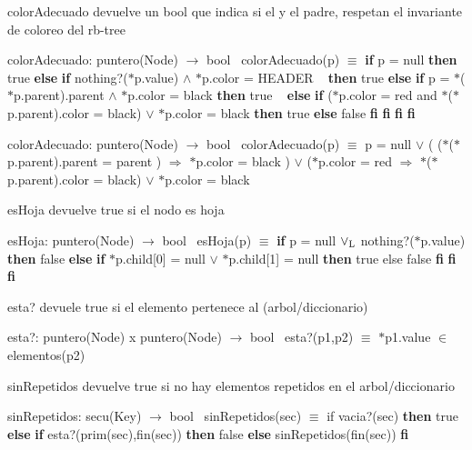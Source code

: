 \begin{DoxyParagraph}{color\+Adecuado}
devuelve un bool que indica si el y el padre, respetan el invariante de coloreo del rb-\/tree

color\+Adecuado\+: puntero(\+Node) $\to$ bool~\newline
 color\+Adecuado(p) $\equiv$ {\bfseries if} p = null {\bfseries then} true {\bfseries else} {\bfseries if} nothing?($\ast$p.value) $\land$ $\ast$p.color = H\+E\+A\+D\+ER ~\newline
 {\bfseries then} true {\bfseries else} {\bfseries if} p = $\ast$($\ast$p.parent).parent $\land$ $\ast$p.color = black {\bfseries then} true ~\newline
 {\bfseries else} {\bfseries if} ($\ast$p.color = red and $\ast$($\ast$p.parent).color = black) $\lor$ $\ast$p.color = black {\bfseries then} true {\bfseries else} false {\bfseries fi} {\bfseries fi} {\bfseries fi} {\bfseries fi} 

color\+Adecuado\+: puntero(\+Node) $\to$ bool~\newline
 color\+Adecuado(p) $\equiv$ p = null $\lor$ ( ($\ast$($\ast$p.parent).parent = parent ) $\Rightarrow$ $\ast$p.color = black ) $\lor$ ($\ast$p.color = red $\Rightarrow$ $\ast$($\ast$p.parent).color = black) $\lor$ $\ast$p.color = black 
\end{DoxyParagraph}


\begin{DoxyParagraph}{es\+Hoja}
devuelve true si el nodo es hoja

es\+Hoja\+: puntero(\+Node) $\to$ bool~\newline
 es\+Hoja(p) $\equiv$ {\bfseries if} p = null $\lor_{\rm L}$ nothing?($\ast$p.value) {\bfseries then} false {\bfseries else} {\bfseries if} $\ast$p.child\mbox{[}0\mbox{]} = null $\lor$ $\ast$p.child\mbox{[}1\mbox{]} = null {\bfseries then} true else false {\bfseries fi} {\bfseries fi} {\bfseries fi} 
\end{DoxyParagraph}


\begin{DoxyParagraph}{esta?}
devuele true si el elemento pertenece al (arbol/diccionario)

esta?\+: puntero(\+Node) x puntero(\+Node) $\to$ bool~\newline
 esta?(p1,p2) $\equiv$ $\ast$p1.value $\in$ elementos(p2) 
\end{DoxyParagraph}


\begin{DoxyParagraph}{sin\+Repetidos}
devuelve true si no hay elementos repetidos en el arbol/diccionario

sin\+Repetidos\+: secu(\+Key) $\to$ bool~\newline
 sin\+Repetidos(sec) $\equiv$ if vacia?(sec) {\bfseries then} true {\bfseries else} {\bfseries if} esta?(prim(sec),fin(sec)) {\bfseries then} false {\bfseries else} sin\+Repetidos(fin(sec)) {\bfseries fi} 
\end{DoxyParagraph}


